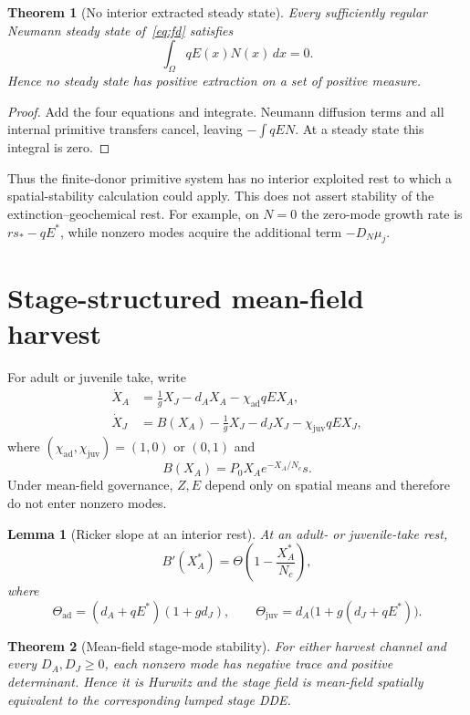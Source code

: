 \documentclass[11pt]{article}
\newtheorem{theorem}{Theorem}
\newtheorem{lemma}{Lemma}
\theoremstyle{definition}
\begin{document}
\begin{theorem}[No interior extracted steady state]
\label{thm:norest}
Every sufficiently regular Neumann steady state of~\eqref{eq:fd} satisfies
\begin{equation}
\int_\Omega qE(x)N(x)\,dx=0.
\label{eq:noextract}
\end{equation}
Hence no steady state has positive extraction on a set of positive measure.
\end{theorem}

\begin{proof}
Add the four equations and integrate. Neumann diffusion terms and all internal primitive transfers cancel, leaving $-\int qEN$. At a steady state this integral is zero.\end{proof}

Thus the finite-donor primitive system has no interior exploited rest to which a spatial-stability calculation could apply. This does not assert stability of the extinction–geochemical rest. For example, on $N=0$ the zero-mode growth rate is $rs_*-qE^*$, while nonzero modes acquire the additional term $-D_N\mu_j$.

\section{Stage-structured mean-field harvest}
\label{sec:stage}

For adult or juvenile take, write
\begin{align}
\dot X_A&=\tfrac1gX_J-d_AX_A-\chi_{\mathrm{ad}}qEX_A,\\
\dot X_J&=B(X_A)-\tfrac1gX_J-d_JX_J-\chi_{\mathrm{juv}}qEX_J,
\label{eq:stage-ode}
\end{align}
where $(\chi_{\mathrm{ad}},\chi_{\mathrm{juv}})=(1,0)$ or $(0,1)$ and
\[
B(X_A)=P_0X_Ae^{-X_A/N_c}s.
\]
Under mean-field governance, $Z,E$ depend only on spatial means and therefore do not enter nonzero modes.

\begin{lemma}[Ricker slope at an interior rest]
\label{lem:ricker}
At an adult- or juvenile-take rest,
\[
B'(X_A^*)=\Theta\left(1-\frac{X_A^*}{N_c}\right),
\]
where
\[
\Theta_{\mathrm{ad}}=(d_A+qE^*)(1+gd_J),
\qquad
\Theta_{\mathrm{juv}}=d_A\bigl(1+g(d_J+qE^*)\bigr).
\]
\end{lemma}

\begin{theorem}[Mean-field stage-mode stability]
\label{thm:stage}
For either harvest channel and every $D_A,D_J\ge0$, each nonzero mode has negative trace and positive determinant. Hence it is Hurwitz and the stage field is mean-field spatially equivalent to the corresponding lumped stage DDE.
\end{theorem}
\end{document}

